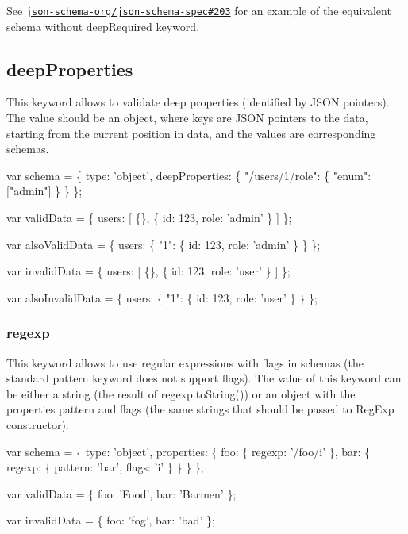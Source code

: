 See \href{https://github.com/json-schema-org/json-schema-spec/issues/203#issue-197211916}{\tt json-\/schema-\/org/json-\/schema-\/spec\#203} for an example of the equivalent schema without {\ttfamily deep\+Required} keyword.

\subsection*{{\ttfamily deep\+Properties}}

This keyword allows to validate deep properties (identified by J\+S\+ON pointers). The value should be an object, where keys are J\+S\+ON pointers to the data, starting from the current position in data, and the values are corresponding schemas.


\begin{DoxyCode}
var schema = \{
  type: 'object',
  deepProperties: \{
    "/users/1/role": \{ "enum": ["admin"] \}
  \}
\};

var validData = \{
  users: [
    \{\},
    \{
      id: 123,
      role: 'admin'
    \}
  ]
\};

var alsoValidData = \{
  users: \{
    "1": \{
      id: 123,
      role: 'admin'
    \}
  \}
\};

var invalidData = \{
  users: [
    \{\},
    \{
      id: 123,
      role: 'user'
    \}
  ]
\};

var alsoInvalidData = \{
  users: \{
    "1": \{
      id: 123,
      role: 'user'
    \}
  \}
\};
\end{DoxyCode}


\subsubsection*{{\ttfamily regexp}}

This keyword allows to use regular expressions with flags in schemas (the standard {\ttfamily pattern} keyword does not support flags). The value of this keyword can be either a string (the result of {\ttfamily regexp.\+to\+String()}) or an object with the properties {\ttfamily pattern} and {\ttfamily flags} (the same strings that should be passed to Reg\+Exp constructor).


\begin{DoxyCode}
var schema = \{
  type: 'object',
  properties: \{
    foo: \{ regexp: '/foo/i' \},
    bar: \{ regexp: \{ pattern: 'bar', flags: 'i' \} \}
  \}
\};

var validData = \{
  foo: 'Food',
  bar: 'Barmen'
\};

var invalidData = \{
  foo: 'fog',
  bar: 'bad'
\};
\end{DoxyCode}


